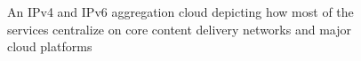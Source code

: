 \begin{figure}[t]
  \begin{minipage}[t]{0.50\textwidth}
    \centering
  \end{minipage}
  \begin{minipage}[t]{0.50\textwidth}
    \centering
  \end{minipage}
  \caption{\label{fig:v4-v6-cloud}An IPv4 and IPv6 aggregation cloud depicting
how most of the services centralize on core content delivery networks and
major cloud platforms}
\end{figure}

